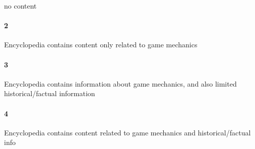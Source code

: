  no content\paragraph{2}Encyclopedia contains content only related to game mechanics\paragraph{3}Encyclopedia contains information about game mechanics, and also limited historical/factual information\paragraph{4}Encyclopedia contains content related to game mechanics and historical/factual info